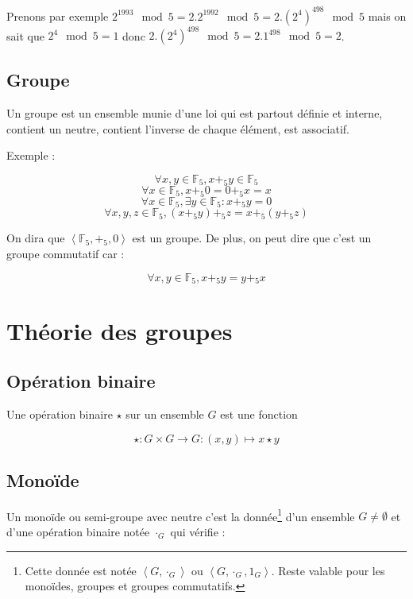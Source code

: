 \documentclass[a4paper,10pt]{article}
\begin{document}
Prenons par exemple $2^{1993} \mod 5 = 2 . 2^{1992} \mod 5 = 2 . \left( 2^4 \right)^{498} \mod 5$ mais on sait que $2^4 \mod 5 = 1$ donc $2 . \left( 2^4 \right)^{498} \mod 5 = 2 . 1^{498} \mod 5 = 2$.

\subsection{Groupe}

Un groupe est un ensemble munie d'une loi qui est partout définie et interne, contient un neutre, contient l'inverse de chaque élément, est associatif.

Exemple :

$$\forall x,y \in \mathbb{F}_5, x +_5 y \in \mathbb{F}_5$$
$$\forall x \in \mathbb{F}_5, x +_5 0 = 0 +_5 x = x$$
$$\forall x \in \mathbb{F}_5, \exists y \in \mathbb{F}_5 : x +_5 y = 0$$
$$\forall x,y,z \in \mathbb{F}_5, (x +_5 y)  +_5 z  = x +_5 (y +_5 z)$$

On dira que $\left\langle \mathbb{F}_5 , +_5 , 0 \right\rangle$ est un groupe. De plus, on peut dire que c'est un groupe commutatif car :

$$\forall x,y \in \mathbb{F}_5, x +_5 y = y +_5 x$$

\newpage 

\section{Théorie des groupes}

\subsection{Opération binaire}

Une opération binaire $\star$ sur un ensemble $G$ est une fonction 

$$\star : G \times G \rightarrow G : (x,y) \mapsto x \star y$$

\subsection{Monoïde}

Un monoïde ou semi-groupe avec neutre c'est la donnée\footnote{Cette donnée est notée $\left\langle G , \cdot_G \right\rangle$ ou $\left\langle G , \cdot_G , 1_G \right\rangle$. Reste valable pour les monoïdes, groupes et groupes commutatifs.} d'un ensemble $G \neq \emptyset$ et d'une opération binaire notée $\cdot_G$ qui vérifie :
\end{document}
